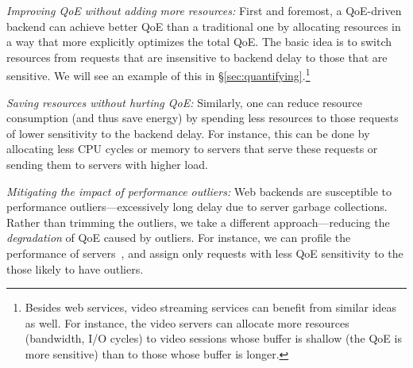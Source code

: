 \begin{packeditemize}
\item{\em Improving QoE without adding more resources:} 
First and foremost, a QoE-driven backend can achieve better QoE than a traditional one by allocating resources in a way that more explicitly optimizes the total QoE. 
The basic idea is to switch resources from requests that are insensitive to backend delay to those that are sensitive.
We will see an example of this in \S\ref{sec:quantifying}.\footnote{Besides web services, video streaming services can benefit from similar ideas as well. For instance, the video servers can allocate more resources (\eg bandwidth, I/O cycles) to video sessions whose buffer is shallow (\ie the QoE is more sensitive) than to those whose buffer is longer.}

\item{\em Saving resources without hurting QoE:}
Similarly, one can reduce resource consumption (and thus save energy) by spending less resources to those requests of lower sensitivity to the backend delay. For instance, this can be done by allocating less CPU cycles or memory to servers that serve these requests or sending them to servers with higher load.

\item{\em Mitigating the impact of performance outliers:} 
Web backends are susceptible to performance outliers---excessively long delay due to \eg server garbage collections. 
Rather than trimming the outliers, we take a different approach---reducing the {\em degradation} of QoE caused by outliers.
For instance, we can profile the performance of servers~\cite{yadwadkar2014wrangler}, and assign only requests with less QoE sensitivity to the those likely to have outliers. 
    
\end{packeditemize}


